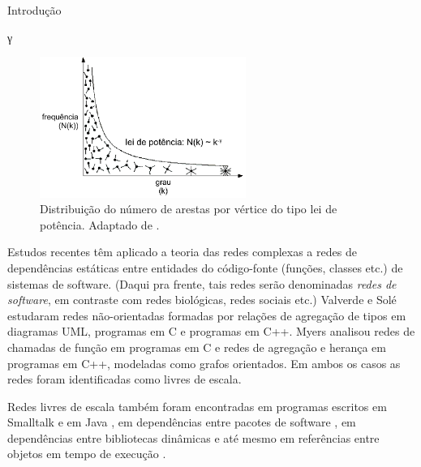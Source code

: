\begin{section}{Introdução}

γ
\begin{figure}[htbp]
	\centering
	\includegraphics[width=0.6\textwidth]{figuras/leidepotencia}
	\caption{Distribuição do número de arestas por vértice do tipo lei de potência. Adaptado de \cite{Barabasi2007}.}
	\label{fig:leidepotencia}
\end{figure}


Estudos recentes têm aplicado a teoria das redes complexas a redes de dependências estáticas entre entidades do código-fonte (funções, classes etc.) de sistemas de software. (Daqui pra frente, tais redes serão denominadas \emph{redes de software}, em contraste com redes biológicas, redes sociais etc.) Valverde e Solé \cite{Valverde2003} estudaram redes não-orientadas formadas por relações de agregação de tipos em diagramas UML, programas em C e programas em C++. Myers \cite{Myers2003} analisou redes de chamadas de função em programas em C e redes de agregação e herança em programas em C++, modeladas como grafos orientados. Em ambos os casos as redes foram identificadas como livres de escala. 

Redes livres de escala também foram encontradas em programas escritos em Smalltalk \cite{Marchesi2004,Concas2007} e em Java \cite{Hyland-Wood2006,Baxter2006,Ichii2008}, em dependências entre pacotes de software \cite{Labelle2004}, em dependências entre bibliotecas dinâmicas \cite{Louridas2008} e até mesmo em referências entre objetos em tempo de execução \cite{Potanin2005}.


\end{section}

